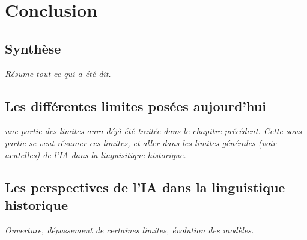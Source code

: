 \documentclass[12pt, french, twoside]{report}
\begin{document}
\chapter{Conclusion}
\section{Synthèse}
\textit{Résume tout ce qui a été dit.}
\section{Les différentes limites posées aujourd'hui}
\textit{une partie des limites aura déjà été traitée dans le chapitre précédent. Cette sous partie se veut résumer ces limites, et aller dans les limites générales (voir acutelles) de l'IA dans  la linguisitique historique.}
\section{Les perspectives de l'IA dans la linguistique historique}
\textit{Ouverture, dépassement de certaines limites, évolution des modèles.}

\printbibliography[heading=bibintoc]
\end{document}
